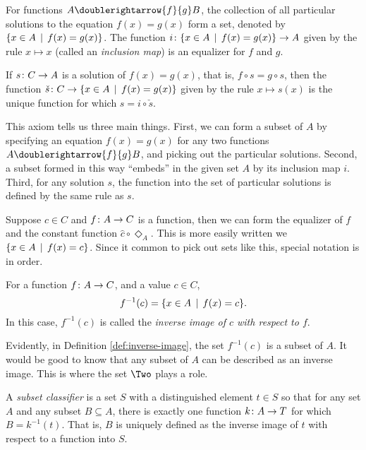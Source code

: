 \begin{principle}
	For functions $A\doublerightarrow{f}{g} B$, the collection of all particular solutions to the equation $f(x)=g(x)$ form a set, denoted by $\{x\in A\,\mid\, f(x) = g(x)\}$. 	
	The function ${i}\colon{\{x\in A\,\mid\,f(x)=g(x)\}}\to{A}$ given by the rule $x\mapsto x$ (called an \emph{inclusion map}) is an equalizer for $f$ and $g$.
	
	If ${s}\colon{C}\to{A}$ is a solution of  $f(x)=g(x)$, that is, $f\circ s = g\circ s$,
	then the function ${\check s}\colon{C}\to{\{x\in A\,\mid\,f(x)=g(x)\}}$ given by the rule $x\mapsto s(x)$
	is the unique function for which $s = i\circ \check s$. 
\end{principle}

This axiom tells us three main things.
First, we can form a subset of $A$ by specifying an equation $f(x)=g(x)$ for any two functions $A\doublerightarrow{f}{g}B$, and picking out the particular solutions.
Second, a subset formed in this way ``embeds'' in the given set $A$ by its inclusion map $i$.
Third, for any solution $s$, the function into the set of particular solutions is defined by the same rule as $s$.

Suppose $c\in C$ and ${f}\colon{A}\to{C}$ is a function, then we can form the equalizer of $f$ and the constant function $\hat{c}\circ\Diamond_A$.
This is more easily written we $\{x\in A\,\mid\, f(x)=c\}$.
Since it common to pick out sets like this, special notation is in order.

\begin{defn}\label{def:inverse-image}
	For a function ${f}\colon{A}\to{C}$, and a value $c\in C$, 
	\[f^{-1}(c) = \{x\in A\,\mid\, f(x)=c\}.\] 
	In this case, $f^{-1}(c)$ is called the \emph{inverse image of $c$ with respect to $f$}.
\end{defn}

Evidently, in Definition \ref{def:inverse-image}, the set $f^{-1}(c)$ is a subset of $A$.
It would be good to know that any subset of $A$ can be described as an inverse image.
This is where the set $\Two$ plays a role.

\begin{defn}\label{def:subset-classifier}
	A \emph{subset classifier} is a set $S$ with a distinguished element $t\in S$ so that for any set $A$ and any subset $B\subseteq A$, there is exactly one function ${k}\colon{A}\to{T}$ for which $B = k^{-1}(t)$.
	That is, $B$ is uniquely defined as the inverse image of $t$ with respect to a function into $S$.
\end{defn}

